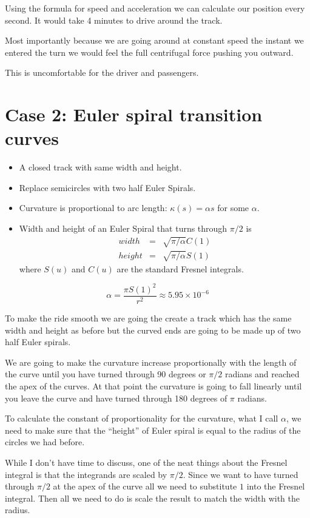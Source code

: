 \documentclass[12pt]{article} %
\theoremstyle{definition}
\theoremstyle{theorem}
\begin{document}
Using the formula for speed and acceleration we can calculate our position every second. It would take 4 minutes to drive around the track.

Most importantly because we are going around at constant speed the instant we entered the turn we would feel the full centrifugal force pushing you outward.

This is uncomfortable for the driver and passengers. 

\section{Case 2: Euler spiral transition curves}
\begin{tcolorbox}
	\begin{itemize}
		\item A closed track with same width and height. 
		\item Replace semicircles with two half Euler Spirals.
		\item Curvature is proportional to arc length: $\kappa(s) = \alpha s $ for some $\alpha$.
		\item Width and height of an Euler Spiral that turns through $\pi/2$ is 
		\begin{eqnarray*}
			width &=& \sqrt{\pi / \alpha} C(1) \\
			height &=& \sqrt{\pi /\alpha} S(1)
		\end{eqnarray*}
		where $S(u)$ and $C(u)$ are the standard Fresnel integrals.
	\end{itemize}
	\[
		\alpha = \frac{\pi S(1)^2}{r^2} \approx 5.95 \times 10 ^{-6}
	\]
\end{tcolorbox}

To make the ride smooth we are going the create a track which has the same width and height as before but the curved ends are going to be made up of two half Euler spirals.

We are going to make the curvature increase proportionally with the length of the curve until you have turned through 90 degrees or $\pi/2$ radians and reached the apex of the curves. At that point the curvature is going to fall linearly until you leave the curve and have turned through 180 degrees of $\pi$ radians.

To calculate the constant of proportionality for the curvature, what I call $\alpha$, we need to make sure that the ``height'' of Euler spiral is equal to the radius of the circles we had before.

While I don't have time to discuss, one of the neat things about the Fresnel integral is that the integrands are scaled by $\pi/2$. Since we want to have turned through $\pi/2$ at the apex of the curve all we need to substitute $1$ into the Fresnel integral. Then all we need to do is scale the result to match the width with the radius. 
\end{document}
